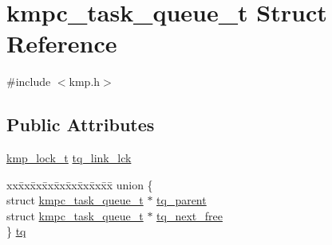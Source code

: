 \hypertarget{structkmpc__task__queue__t}{\section{kmpc\-\_\-task\-\_\-queue\-\_\-t Struct Reference}
\label{structkmpc__task__queue__t}
}


{\ttfamily \#include $<$kmp.\-h$>$}

\subsection*{Public Attributes}
\begin{DoxyCompactItemize}
\item 
\hyperlink{kmp__lock_8h_ad1928c8c2d45f7848000a372ec4fde54}{kmp\-\_\-lock\-\_\-t} \hyperlink{structkmpc__task__queue__t_ab58a0e786802a553d6a8982490ec868b}{tq\-\_\-link\-\_\-lck}
\item 
\begin{tabbing}
xx\=xx\=xx\=xx\=xx\=xx\=xx\=xx\=xx\=\kill
union \{\\
\>struct \hyperlink{structkmpc__task__queue__t}{kmpc\_task\_queue\_t} $\ast$ \hyperlink{structkmpc__task__queue__t_a6cb2351947e23ee8877b495428f6a59f}{tq\_parent}\\
\>struct \hyperlink{structkmpc__task__queue__t}{kmpc\_task\_queue\_t} $\ast$ \hyperlink{structkmpc__task__queue__t_a1ed21643e12300700496257e9d543351}{tq\_next\_free}\\
\} \hyperlink{structkmpc__task__queue__t_a553762c08b35b448cda7d34f5f6047c7}{tq}\\


\end{tabbing}
\end{DoxyCompactItemize}
